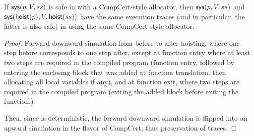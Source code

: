 \begin{theorem}
  If $\text{\textsf{sys}}(p, V, ss)$ is safe in  with a CompCert-style allocator,
  then $\text{\textsf{sys}}(p, V, ss)$ and $\text{\textsf{sys}}(\text{\textsf{hoist}}(p), V, \text{\textsf{hoist}}(ss))$
  have the same execution traces (and in particular, the latter is
  also safe) in  using the same CompCert-style allocator.
\end{theorem}
\begin{proof}
  Forward downward simulation from  before to  after hoisting,
  where one step before corresponds to one step after, except at
  function entry where at least two steps are required in the compiled
  program (function entry, followed by entering the enclosing block
  that was added at function translation, then allocating all local
  variables if any), and at function exit, where two steps are
  required in the compiled program (exiting the added block before
  exiting the function.)

  Then, since  is deterministic, the forward downward simulation is
  flipped into an upward simulation in the flavor of CompCert; thus
  preservation of traces.


\end{proof}
